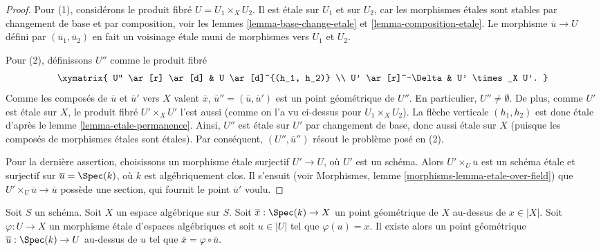 \begin{proof}
Pour (1), considérons le produit fibré $U = U_1 \times_X U_2$.
Il est \'etale sur $U_1$ et sur $U_2$, car les morphismes \'etales sont
stables par changement de base et par composition, voir les
lemmes \ref{lemma-base-change-etale} et \ref{lemma-composition-etale}.
Le morphisme $\overline{u} \to U$ défini par $(\overline{u}_1, \overline{u}_2)$
en fait un voisinage \'etale muni de morphismes vers
$U_1$ et $U_2$.

\medskip\noindent
Pour (2), définissons $U''$ comme le produit fibré
$$
\xymatrix{
U'' \ar[r] \ar[d] & U \ar[d]^{(h_1, h_2)} \\
U' \ar[r]^-\Delta & U' \times_X U'.
}
$$
Comme les composés de $\overline{u}$ et $\overline{u}'$ vers $X$ valent $\overline{x}$,
$\overline{u}'' = (\overline{u}, \overline{u}')$ est un point géométrique
de $U''$. En particulier, $U'' \not = \emptyset$.
De plus, comme $U'$ est \'etale sur $X$, le produit fibré
$U'\times_X U'$ l'est aussi (comme on l'a vu ci-dessus pour $U_1 \times_X U_2$).
La flèche verticale $(h_1, h_2)$ est donc \'etale d'après le
lemme \ref{lemma-etale-permanence}.
Ainsi, $U''$ est \'etale sur $U'$ par changement de base, donc aussi
\'etale sur $X$ (puisque les composés de morphismes \'etales sont \'etales).
Par conséquent, $(U'', \overline{u}'')$ résout le problème posé en (2).

\medskip\noindent
Pour la dernière assertion, choisissons un morphisme \'etale surjectif
$U' \to U$, où $U'$ est un schéma. Alors
$U' \times_U \overline{u}$ est un schéma \'etale et surjectif sur
$\overline{u} = \Spec(k)$, où $k$ est algébriquement clos.
Il s'ensuit (voir
Morphismes, lemme \ref{morphisms-lemma-etale-over-field})
que $U' \times_U \overline{u} \to \overline{u}$ possède une section,
qui fournit le point $\overline{u}'$ voulu.
\end{proof}

\begin{lemma}
\label{lemma-geometric-lift-to-usual}
Soit $S$ un schéma. Soit $X$ un espace algébrique sur $S$.
Soit $\overline{x} : \Spec(k) \to X$ un point géométrique de $X$
au-dessus de $x \in |X|$. Soit $\varphi : U \to X$ un morphisme \'etale
d'espaces algébriques et soit $u \in |U|$ tel que $\varphi(u) = x$.
Il existe alors un point géométrique
$\overline{u} : \Spec(k) \to U$ au-dessus de $u$ tel que
$\overline{x} = \varphi \circ \overline{u}$.
\end{lemma}

